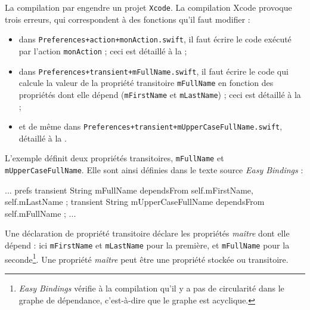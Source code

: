 La compilation par  engendre un projet \texttt{Xcode}. La compilation Xcode provoque trois erreurs, qui correspondent à des fonctions qu'il faut modifier :
\begin{itemize}
  \item dans \texttt{Preferences+action+monAction.swift}, il faut écrire le code exécuté par l'action \texttt{monAction} ; ceci est détaillé à la  ;
  \item dans \texttt{Preferences+transient+mFullName.swift}, il faut écrire le code qui calcule la valeur de la propriété transitoire \texttt{mFullName} en fonction des propriétés dont elle dépend (\texttt{mFirstName} et \texttt{mLastName}) ; ceci est détaillé à la  ;
  \item et de même dans \texttt{Preferences+transient+mUpperCaseFullName.swift}, détaillé à la .
\end{itemize}











L'exemple définit deux propriétés transitoires, \texttt{mFullName} et \texttt{mUpperCaseFullName}. Elle sont ainsi définies dans le texte source \emph{Easy Bindings} :
\begin{ebcode}
...
prefs {
  transient String mFullName dependsFrom self.mFirstName, self.mLastName ;
  transient String mUpperCaseFullName dependsFrom self.mFullName ;
  ...
}
\end{ebcode}

Une déclaration de propriété transitoire déclare les propriétés \emph{maître} dont elle dépend : ici \texttt{mFirstName} et \texttt{mLastName} pour la première, et \texttt{mFullName} pour la seconde\footnote{\emph{Easy Bindings} vérifie à la compilation qu'il y a pas de circularité dans le graphe de dépendance, c'est-à-dire que le graphe est acyclique.}. Une propriété \emph{maître} peut être une propriété stockée ou transitoire.

